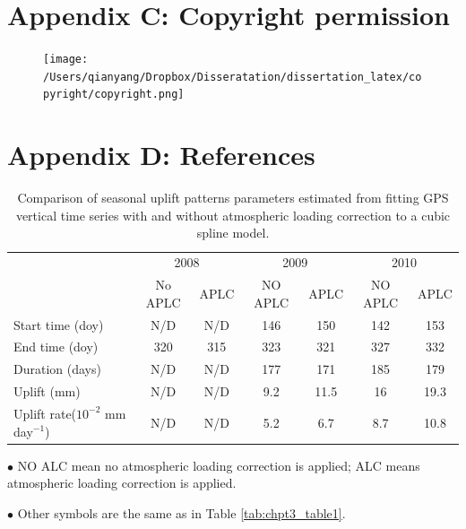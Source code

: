 \newpage
\section*{Appendix C: Copyright permission}
\begin{figure}[h!]
	\centering
	\texttt{[image: /Users/qianyang/Dropbox/Disseratation/dissertation\_latex/copyright/copyright.png]}
\end{figure}

\clearpage
\section*{Appendix D: References}



\clearpage
\begin{table}[h!]
	\centering
	\caption{Comparison of seasonal uplift patterns parameters estimated from fitting GPS vertical time series with and without atmospheric loading correction to a cubic spline model.}
	\begin{adjustbox}{width=1\textwidth}
	\begin{threeparttable}
		\begin{tabular}{lcccccc}
			\midrule
			&\multicolumn{2}{c}{2008} & \multicolumn{2}{c}{2009} & \multicolumn{2}{c}{2010} \\
			& No APLC & APLC & NO APLC & APLC & NO APLC & APLC \\
			\midrule
			Start time (doy) & N/D & N/D & 146 & 150 & 142 & 153\\
			End time (doy) & 320 & 315 & 323 & 321 & 327 & 332\\
			Duration (days) & N/D & N/D & 177 & 171 & 185 & 179\\
			Uplift (mm) & N/D & N/D & 9.2 & 11.5 & 16 & 19.3\\
			Uplift rate($10^{-2}$ mm day$^{-1}$) & N/D & N/D & 5.2 & 6.7 & 8.7 & 10.8\\
			\midrule
		\end{tabular}
		\begin{tablenotes}
			\small
			\item $\bullet$ NO ALC mean no atmospheric loading correction is applied; ALC means atmospheric loading correction is applied. 
			\item $\bullet$ Other symbols are the same as in Table \ref{tab:chpt3_table1}.
		\end{tablenotes}
		\end{threeparttable}
	\end{adjustbox}
	\label{tab:SI_chpt3_table1}
\end{table}

